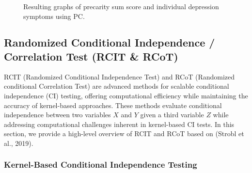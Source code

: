 \documentclass[
]{article}
\begin{document}
\begin{figure}


\caption{\label{fig-pc_presum}Resulting graphs of precarity sum score
and individual depression symptoms using PC.}

\end{figure}%

\clearpage

\subsection{Randomized Conditional Independence / Correlation Test (RCIT
\& RCoT)}\label{sec-rcot}

RCIT (Randomized Conditional Independence Test) and RCoT (Randomized
conditional Correlation Test) are advanced methods for scalable
conditional independence (CI) testing, offering computational efficiency
while maintaining the accuracy of kernel-based approaches. These methods
evaluate conditional independence between two variables \(X\) and \(Y\)
given a third variable \(Z\) while addressing computational challenges
inherent in kernel-based CI tests. In this section, we provide a
high-level overview of RCIT and RCoT based on (Strobl et al., 2019).

\subsubsection{Kernel-Based Conditional Independence
Testing}\label{kernel-based-conditional-independence-testing}
\end{document}
